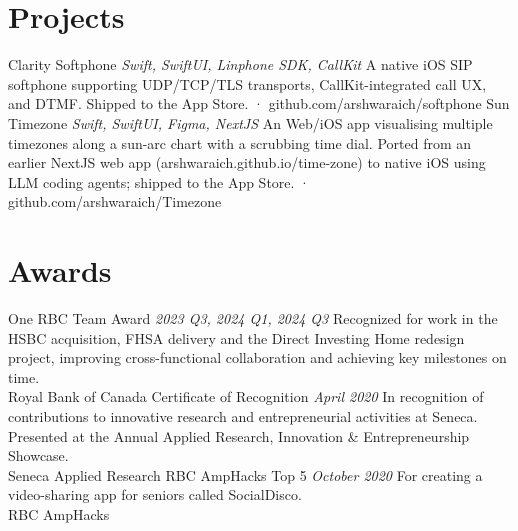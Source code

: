 \documentclass[letterpaper]{moderncv}
\begin{document}
\section{Projects}
\cventry
{}
{Clarity Softphone}
{}
{\textit{Swift, SwiftUI, Linphone SDK, CallKit}}
{}
{A native iOS SIP softphone supporting UDP/TCP/TLS transports, CallKit-integrated call UX, and DTMF. Shipped to the App Store. · github.com/arshwaraich/softphone}
\vspace{1mm}
\cventry
{}
{Sun Timezone}
{}
{\textit{Swift, SwiftUI, Figma, NextJS}}
{}
{An Web/iOS app visualising multiple timezones along a sun-arc chart with a scrubbing time dial. Ported from an earlier NextJS web app (arshwaraich.github.io/time-zone) to native iOS using LLM coding agents; shipped to the App Store. · github.com/arshwaraich/Timezone}
\vspace{1mm}
\section{Awards}
\cventry
{}
{One RBC Team Award}
{}
{\textit{2023 Q3, 2024 Q1, 2024 Q3}}
{}
{Recognized for work in the HSBC acquisition, FHSA delivery and the Direct Investing Home redesign project, improving cross-functional collaboration and achieving key milestones on time.\\Royal Bank of Canada}
\vspace{1mm}
\cventry
{}
{Certificate of Recognition}
{}
{\textit{April 2020}}
{}
{In recognition of contributions to innovative research and entrepreneurial activities at Seneca. Presented at the Annual Applied Research, Innovation \& Entrepreneurship Showcase.\\Seneca Applied Research}
\vspace{1mm}
\cventry
{}
{RBC AmpHacks Top 5}
{}
{\textit{October 2020}}
{}
{For creating a video-sharing app for seniors called SocialDisco.\\RBC AmpHacks}
\vspace{1mm}
\end{document}
